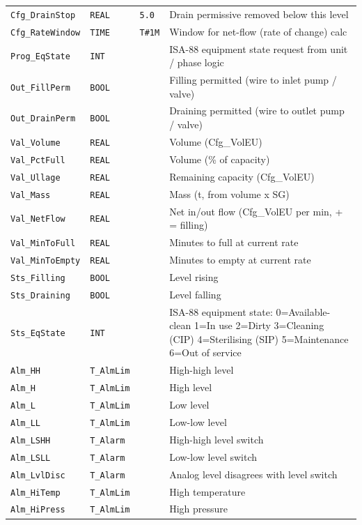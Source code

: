 {\begin{longtable}{@{}>{\raggedright\arraybackslash}p{3.4cm}>{\raggedright\arraybackslash}p{3.3cm}>{\raggedright\arraybackslash}p{1.3cm}>{\raggedright\arraybackslash}p{6.4cm}@{}}
\texttt{Cfg\_DrainStop} & \texttt{REAL} & \texttt{5.0} & Drain permissive removed below this level \\
\texttt{Cfg\_RateWindow} & \texttt{TIME} & \texttt{T\#1M} & Window for net-flow (rate of change) calc \\
\texttt{Prog\_EqState} & \texttt{INT} &  & ISA-88 equipment state request from unit /\allowbreak{} phase logic \\
\texttt{Out\_FillPerm} & \texttt{BOOL} &  & Filling permitted (wire to inlet pump /\allowbreak{} valve) \\
\texttt{Out\_DrainPerm} & \texttt{BOOL} &  & Draining permitted (wire to outlet pump /\allowbreak{} valve) \\
\texttt{Val\_Volume} & \texttt{REAL} &  & Volume (Cfg\_VolEU) \\
\texttt{Val\_PctFull} & \texttt{REAL} &  & Volume (\% of capacity) \\
\texttt{Val\_Ullage} & \texttt{REAL} &  & Remaining capacity (Cfg\_VolEU) \\
\texttt{Val\_Mass} & \texttt{REAL} &  & Mass (t, from volume x SG) \\
\texttt{Val\_NetFlow} & \texttt{REAL} &  & Net in/\allowbreak{}out flow (Cfg\_VolEU per min, + = filling) \\
\texttt{Val\_MinToFull} & \texttt{REAL} &  & Minutes to full at current rate \\
\texttt{Val\_MinToEmpty} & \texttt{REAL} &  & Minutes to empty at current rate \\
\texttt{Sts\_Filling} & \texttt{BOOL} &  & Level rising \\
\texttt{Sts\_Draining} & \texttt{BOOL} &  & Level falling \\
\texttt{Sts\_EqState} & \texttt{INT} &  & ISA-88 equipment state: 0=Available-clean 1=In use 2=Dirty 3=Cleaning (CIP) 4=Sterilising (SIP) 5=Maintenance 6=Out of service \\
\texttt{Alm\_HH} & \texttt{T\_AlmLim} &  & High-high level \\
\texttt{Alm\_H} & \texttt{T\_AlmLim} &  & High level \\
\texttt{Alm\_L} & \texttt{T\_AlmLim} &  & Low level \\
\texttt{Alm\_LL} & \texttt{T\_AlmLim} &  & Low-low level \\
\texttt{Alm\_LSHH} & \texttt{T\_Alarm} &  & High-high level switch \\
\texttt{Alm\_LSLL} & \texttt{T\_Alarm} &  & Low-low level switch \\
\texttt{Alm\_LvlDisc} & \texttt{T\_Alarm} &  & Analog level disagrees with level switch \\
\texttt{Alm\_HiTemp} & \texttt{T\_AlmLim} &  & High temperature \\
\texttt{Alm\_HiPress} & \texttt{T\_AlmLim} &  & High pressure \\
\bottomrule
\end{longtable}
}
